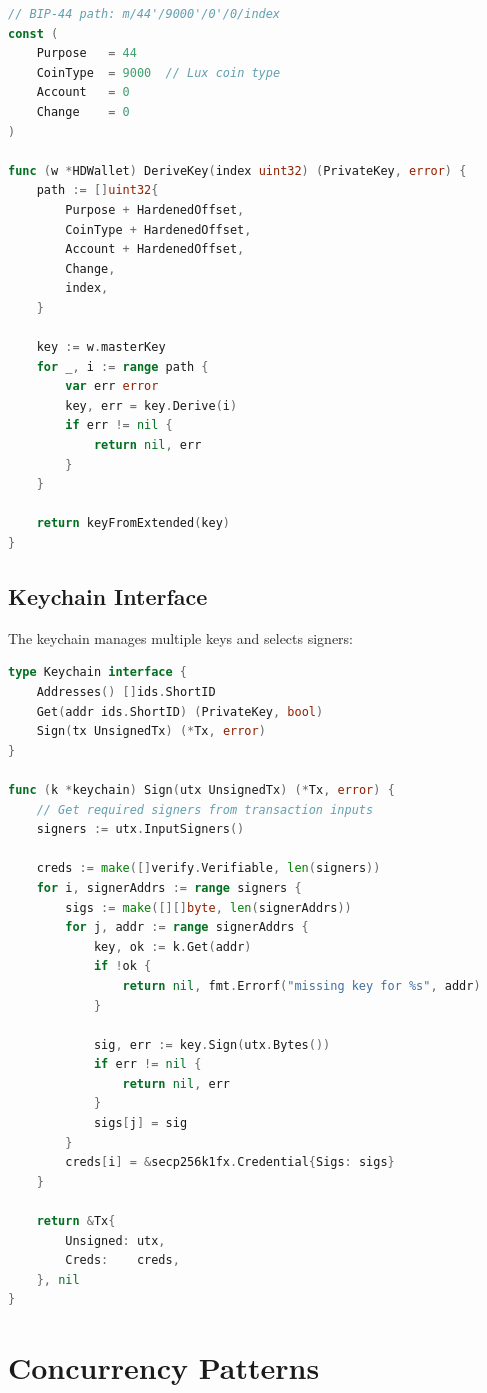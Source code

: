 \documentclass[11pt,twocolumn]{article}
\begin{document}
\begin{lstlisting}[language=Go,caption=HD Key Derivation]
// BIP-44 path: m/44'/9000'/0'/0/index
const (
    Purpose   = 44
    CoinType  = 9000  // Lux coin type
    Account   = 0
    Change    = 0
)

func (w *HDWallet) DeriveKey(index uint32) (PrivateKey, error) {
    path := []uint32{
        Purpose + HardenedOffset,
        CoinType + HardenedOffset,
        Account + HardenedOffset,
        Change,
        index,
    }

    key := w.masterKey
    for _, i := range path {
        var err error
        key, err = key.Derive(i)
        if err != nil {
            return nil, err
        }
    }

    return keyFromExtended(key)
}
\end{lstlisting}

\subsection{Keychain Interface}

The keychain manages multiple keys and selects signers:

\begin{lstlisting}[language=Go,caption=Keychain Interface]
type Keychain interface {
    Addresses() []ids.ShortID
    Get(addr ids.ShortID) (PrivateKey, bool)
    Sign(tx UnsignedTx) (*Tx, error)
}

func (k *keychain) Sign(utx UnsignedTx) (*Tx, error) {
    // Get required signers from transaction inputs
    signers := utx.InputSigners()

    creds := make([]verify.Verifiable, len(signers))
    for i, signerAddrs := range signers {
        sigs := make([][]byte, len(signerAddrs))
        for j, addr := range signerAddrs {
            key, ok := k.Get(addr)
            if !ok {
                return nil, fmt.Errorf("missing key for %s", addr)
            }

            sig, err := key.Sign(utx.Bytes())
            if err != nil {
                return nil, err
            }
            sigs[j] = sig
        }
        creds[i] = &secp256k1fx.Credential{Sigs: sigs}
    }

    return &Tx{
        Unsigned: utx,
        Creds:    creds,
    }, nil
}
\end{lstlisting}

\section{Concurrency Patterns}
\end{document}

